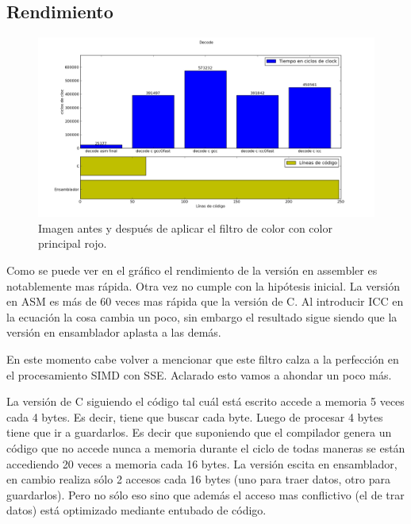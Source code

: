 \newpage

\subsection{Rendimiento}

\begin{figure}[h]
\begin{center}
  \includegraphics[scale=0.5]{secciones/decodificacion/imagenes/decode.png}
\end{center}
\caption{Imagen antes y después de aplicar el filtro de color con color principal rojo.}
\label{fig:rendimiento decode}
\end{figure}

	Como se puede ver en el gráfico el rendimiento de la versión en assembler es notablemente mas rápida. Otra
vez no cumple con la hipótesis inicial. La versión en ASM es más de 60 veces mas rápida que la versión
de C. Al introducir ICC en la ecuación la cosa cambia un poco, sin embargo el resultado sigue siendo que
la versión en ensamblador aplasta a las demás.

	En este momento cabe volver a mencionar que este filtro calza a la perfección en el procesamiento
SIMD con SSE. Aclarado esto vamos a ahondar un poco más.

	La versión de C siguiendo el código tal cuál está escrito accede a memoria 5 veces cada 4 bytes.
Es decir, tiene que buscar cada byte. Luego de procesar 4 bytes tiene que ir a guardarlos. Es decir
que suponiendo que el compilador genera un código que no accede nunca a memoria durante el ciclo de todas
maneras se están accediendo 20 veces a memoria cada 16 bytes. La versión escita en ensamblador, en cambio
realiza sólo 2 accesos cada 16 bytes (uno para traer datos, otro para guardarlos). Pero no sólo eso sino
que además el acceso mas conflictivo (el de trar datos) está optimizado mediante entubado de código.

